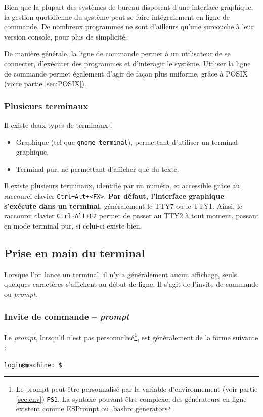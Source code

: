 Bien que la plupart des systèmes de bureau disposent d'une interface graphique, la gestion quotidienne du système peut se faire intégralement en ligne de commande. De nombreux programmes ne sont d'ailleurs qu'une surcouche à leur version console, pour plus de simplicité.

De manière générale, la ligne de commande permet à un utilisateur de se connecter, d'exécuter des programmes et d'interagir le système. Utiliser la ligne de commande permet également d'agir de façon plus uniforme, grâce à POSIX (voire partie \ref{sec:POSIX}).

\subsubsection{Plusieurs terminaux}
Il existe deux types de terminaux : 
\begin{itemize}
    \item Graphique (tel que \texttt{gnome-terminal}), permettant d'utiliser un terminal graphique,
    \item Terminal pur, ne permettant d'afficher que du texte.
\end{itemize}
\vspace{\baselineskip}

Il existe plusieurs terminaux, identifié par un numéro, et accessible grâce au raccourci clavier \texttt{Ctrl+Alt+<FX>}. \textbf{Par défaut, l'interface graphique s'exécute dans un terminal}, généralement le TTY7 ou le TTY1. Ainsi, le raccourci clavier \texttt{Ctrl+Alt+F2} permet de passer au TTY2 à tout moment, passant en mode terminal pur, si celui-ci existe bien.

\newpage

\subsection{Prise en main du terminal}
\vspace{-4mm}
Lorsque l'on lance un terminal, il n'y a généralement aucun affichage, seuls quelques caractères s'affichent au début de ligne. Il s'agit de l'invite de commande ou \textit{prompt}.
\subsubsection{Invite de commande -- \textit{prompt}}

Le \textit{prompt}, lorsqu'il n'est pas personnalisé\footnote{Le prompt peut-être personnalisé par la variable d'environnement (voir partie \ref{sec:env}) \texttt{PS1}. La syntaxe pouvant être complexe, des générateurs en ligne existent comme \href{http://ezprompt.net}{ESPrompt} ou \href{http://bashrcgenerator.com}{.bashrc generator}}, est généralement de la forme suivante :
\begin{nscenter}
    \texttt{login@machine:\tilde~\$}
\end{nscenter}

